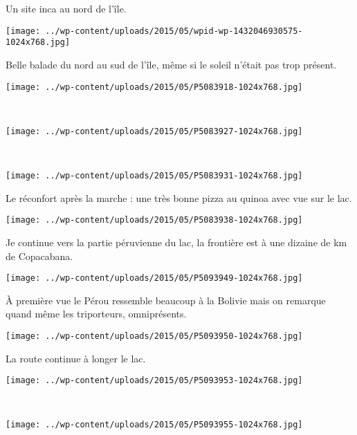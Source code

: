 Un site inca au nord de l'île. 
\begin{center} \texttt{[image: ../wp-content/uploads/2015/05/wpid-wp-1432046930575-1024x768.jpg]} \end{center}
\vspace{-\topsep}
\pagebreak

Belle balade du nord au sud de l'île, même si le soleil n'était pas trop présent. 
\begin{center} \texttt{[image: ../wp-content/uploads/2015/05/P5083918-1024x768.jpg]} \end{center}
~\\
\begin{center} \texttt{[image: ../wp-content/uploads/2015/05/P5083927-1024x768.jpg]} \end{center}
\vspace{-\topsep}
\pagebreak
~\\
\begin{center} \texttt{[image: ../wp-content/uploads/2015/05/P5083931-1024x768.jpg]} \end{center}

Le réconfort après la marche : une très bonne pizza au quinoa avec vue sur le lac. 
\begin{center} \texttt{[image: ../wp-content/uploads/2015/05/P5083938-1024x768.jpg]} \end{center}
\vspace{-\topsep}
\pagebreak

Je continue vers la partie péruvienne du lac, la frontière est à une dizaine de km de Copacabana. 
\begin{center} \texttt{[image: ../wp-content/uploads/2015/05/P5093949-1024x768.jpg]} \end{center}

À première vue le Pérou ressemble beaucoup à la Bolivie mais on remarque quand même les triporteurs, omniprésents. 
\begin{center} \texttt{[image: ../wp-content/uploads/2015/05/P5093950-1024x768.jpg]} \end{center}
\vspace{-\topsep}
\pagebreak

La route continue à longer le lac. \\
\begin{center} \texttt{[image: ../wp-content/uploads/2015/05/P5093953-1024x768.jpg]} \end{center}
~\\
\begin{center} \texttt{[image: ../wp-content/uploads/2015/05/P5093955-1024x768.jpg]} \end{center}
\vspace{-\topsep}
\pagebreak

